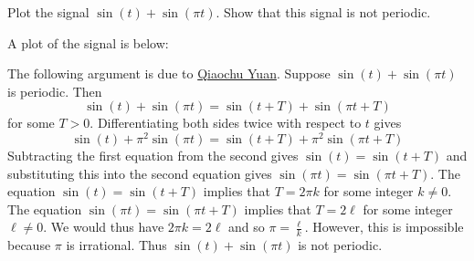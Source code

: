 \begin{excersizelist}
\item \label{exer:sinplussinnotper} Plot the signal $\sin(t) + \sin(\pi t)$.  Show that this signal is not periodic.
\begin{solution}
A plot of the signal is below:

\begin{center}
\end{center}

The following argument is due to \href{http://math.stackexchange.com/questions/1079/sum-of-two-periodic-functions}{Qiaochu Yuan}.  Suppose $\sin(t) + \sin(\pi t)$ is periodic.  Then
\[
\sin(t) + \sin(\pi t) = \sin(t + T) + \sin(\pi t + T)
\]
for some $T > 0$.  Differentiating both sides twice with respect to $t$ gives
\[
\sin(t) + \pi^2 \sin(\pi t) = \sin(t + T) + \pi^2\sin(\pi t + T)
\]
Subtracting the first equation from the second gives $\sin(t) = \sin(t + T)$ and substituting this into the second equation gives $\sin(\pi t) = \sin(\pi t + T)$.  The equation $\sin(t) = \sin(t + T)$ implies that $T = 2\pi k$ for some integer $k \neq 0$.  The equation $\sin(\pi t) = \sin(\pi t + T)$ implies that $T = 2 \ell$ for some integer $\ell \neq 0$.  We would thus have $2\pi k = 2 \ell$ and so $\pi = \tfrac{\ell}{k}$. However, this is impossible because $\pi$ is irrational.  Thus $\sin(t) + \sin(\pi t)$ is not periodic.



\end{solution}
\end{excersizelist}
